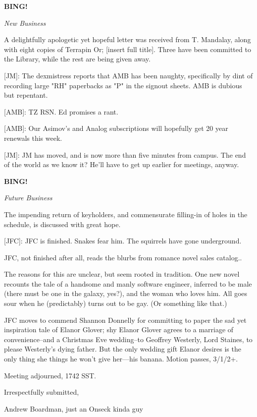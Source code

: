 \documentclass[12pt]{article}
\newcommand{\bing}{{\bf BING!} }
\newcommand{\goto}[1]{\bing \vskip 12pt \centerline{{\em{#1}}}}
\begin{document}
\goto{New Business}

A delightfully apologetic yet hopeful letter was received from T. Mandalay, along with eight copies of Terrapin Or; [insert full title]. Three have been committed to the Library, while the rest are being given away.

[JM]: The dexmistress reports that AMB has been naughty, specifically by dint of recording large "RH" paperbacks as "P" in the signout sheets. AMB is dubious but repentant.

[AMB]: TZ RSN. Ed promises a rant.

[AMB]: Our Asimov's and Analog subscriptions will hopefully get 20 year renewals this week.

[JM]: JM has moved, and is now more than five minutes from campus. The end of the world as we know it?  He'll have to get up earlier for meetings, anyway.

\goto{Future Business}

The impending return of keyholders, and commensurate filling-in of holes in the schedule, is discussed with great hope.

[JFC]: JFC is finished. Snakes fear him. The squirrels have gone underground.

JFC, not finished after all, reads the blurbs from romance novel sales catalog..

The reasons for this are unclear, but seem rooted in tradition. One new novel recounts the tale of a handsome and manly software engineer, inferred to be male (there must be one in the galaxy, yes?), and the woman who loves him.  All goes sour when he (predictably) turns out to be gay. (Or something like that.)

JFC moves to commend Shannon Donnelly for committing to paper the sad yet inspiration tale of Elanor Glover; shy Elanor Glover agrees to a marriage of convenience--and a Christmas Eve wedding--to Geoffrey Westerly, Lord Staines, to please Westerly's dying father. But the only wedding gift Elanor desires is the only thing she things he won't give her---his banana. Motion passes, 3/1/2+.

\vspace{12pt}

\noindent
Meeting adjourned, 1742 SST.

\vspace{18pt}

\centerline{Irrespectfully submitted,}
\centerline{Andrew Boardman, just an Onseck kinda guy}
\end{document}
